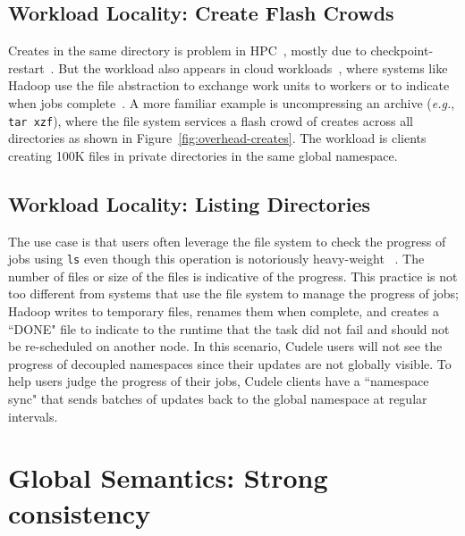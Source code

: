 \subsection{Workload Locality: Create Flash Crowds}

Creates in the same directory is problem in HPC~\cite{weil:sc2004-dyn-metadata,
ren:sc2014-indexfs, patil:fast2011-giga, zheng:pdsw2014-batchfs,
sevilla:sc15-mantle}, mostly due to checkpoint-restart~\cite{bent_plfs_2009}.
But the workload also appears in cloud workloads~\cite{xiao:socc15-shardfs},
where systems like Hadoop use the file abstraction to exchange work units to
workers or to indicate when jobs
complete~\cite{shvachko:login2012-hdfs-scalability}. A more familiar example is
uncompressing an archive ({\it e.g.}, \texttt{tar xzf}), where the file system
services a flash crowd of creates across all directories as shown in
Figure~\ref{fig:overhead-creates}.  The workload is clients creating 100K files
in private directories in the same global namespace.


\subsection{Workload Locality: Listing Directories}

The use case is that users often leverage the file system to check the progress
of jobs using \texttt{ls} even though this operation is notoriously
heavy-weight~\cite{carns:ipdps09-pvfs, eshel:fast10-panache} . The number of
files or size of the files is indicative of the progress. This practice is not
too different from systems that use the file system to manage the progress of
jobs; Hadoop writes to temporary files, renames them when complete, and creates
a ``DONE" file to indicate to the runtime that the task did not fail and should
not be re-scheduled on another node. In this scenario, Cudele users will not
see the progress of decoupled namespaces since their updates are not globally
visible.  To help users judge the progress of their jobs, Cudele clients have a
``namespace sync" that sends batches of updates back to the global namespace at
regular intervals.


\section{Global Semantics: Strong consistency}

